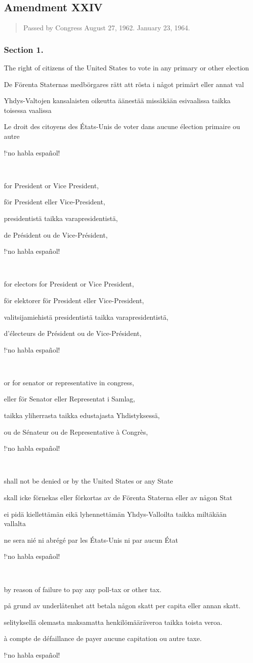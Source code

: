 \documentclass[a4paper,landscape,10pt]{article}
\newcommand{\tblock}[5]{\noindent\begin{minipage}[t]{0.18\textwidth}\foreignlanguage{english}{#1}\end{minipage}\hskip 0.025\textwidth\begin{minipage}[t]{0.18\textwidth}\foreignlanguage{swedish}{#2}\end{minipage}\hskip 0.025\textwidth\begin{minipage}[t]{0.18\textwidth}\foreignlanguage{finnish}{#3}\end{minipage}\hskip 0.025\textwidth\begin{minipage}[t]{0.18\textwidth}\foreignlanguage{french}{#4}\end{minipage}\hskip 0.025\textwidth\begin{minipage}[t]{0.18\textwidth}\foreignlanguage{spanish}{#5}\end{minipage}}
\begin{document}
\subsection*{Amendment XXIV}
\begin{quote}\small
Passed by Congress August 27, 1962.  January 23, 1964.
\end{quote}
\subsubsection*{Section 1.}
\tblock
{The right of citizens of the United States to vote in any primary or other election}
{De Förenta Staternas medbörgares rätt att rösta i något primärt eller annat val}
{Yhdys-Valtojen kansalaisten oikeutta äänestää missäkään esivaalissa taikka toisessa vaalissa}
{Le droit des citoyens des États-Unis de voter dans aucune élection primaire ou autre}
{!`no habla español!}

~

\tblock
{for President or Vice President,}
{för President eller Vice-President,}
{presidentistä taikka varapresidentistä,}
{de Président ou de Vice-Président,}
{!`no habla español!}

~

\tblock
{for electors for President or Vice President,}
{för elektorer för President eller Vice-President,}
{valitsijamiehistä presidentistä taikka varapresidentistä,}
{d'électeurs de Président ou de Vice-Président,}
{!`no habla español!}

~

\tblock
{or for \Gls{senator} or \Gls{representative} in \Gls{congress},}
{eller för Senator eller Representat i Samlag,}
{taikka yliherrasta taikka edustajasta Yhdistyksessä,}
{ou de Sénateur ou de Representative à Congrès,}
{!`no habla español!}

~

\tblock
{shall not be denied or  by the United States or any State}
{skall icke förnekas eller förkortas av de Förenta Staterna eller av någon Stat}
{ei pidä kiellettämän eikä lyhennettämän Yhdys-Valloilta taikka miltäkään vallalta}
{ne sera nié ni abrégé par les États-Unis ni par aucun État}
{!`no habla español!}

~

\tblock
{by reason of failure to pay any \gls{poll-tax} or other tax.}
{på grund av underlåtenhet att betala någon skatt per capita eller annan skatt.}
{selityksellä olemasta maksamatta henkilömääräveroa taikka toista veroa.}
{à compte de défaillance de payer aucune capitation ou autre taxe.}
{!`no habla español!}
\end{document}
